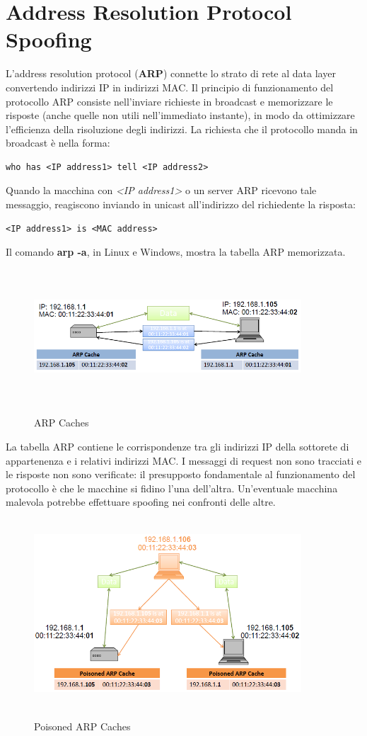 \section{Address Resolution Protocol Spoofing}
L'address resolution protocol (\textbf{ARP}) connette lo strato di rete al data layer convertendo indirizzi IP in indirizzi MAC. Il principio di funzionamento del protocollo ARP consiste nell'inviare richieste in broadcast e memorizzare le risposte (anche quelle non utili nell'immediato instante), in modo da ottimizzare l'efficienza della risoluzione degli indirizzi. La richiesta che il protocollo manda in broadcast è nella forma: 
\begin{lstlisting}
who has <IP address1> tell <IP address2>
\end{lstlisting}
Quando la macchina con \textit{<IP address1>} o un server ARP ricevono tale messaggio, reagiscono inviando in unicast all'indirizzo del richiedente la risposta:
\begin{lstlisting}
<IP address1> is <MAC address>
\end{lstlisting}
Il comando \textbf{arp -a}, in Linux e Windows, mostra la tabella ARP memorizzata. 
\begin{figure}[htbp]
	\centering%
	\subfigure%
	{\includegraphics[height=5cm, width=10cm, keepaspectratio]{Immagini/reti/ARP_Caches.png}}
	\caption{ARP Caches\label{fig:ARP_Caches}} 	
\end{figure}
La tabella ARP contiene le corrispondenze tra gli indirizzi IP della sottorete di appartenenza e i relativi indirizzi MAC. I messaggi di request non sono tracciati e le risposte non sono verificate: il presupposto fondamentale al funzionamento del protocollo è che le macchine si fidino l'una dell'altra. Un'eventuale macchina malevola potrebbe effettuare spoofing nei confronti delle altre.
\begin{figure}[htbp]
	\centering%
	\subfigure%
	{\includegraphics[height=7cm, width=10cm, keepaspectratio]{Immagini/reti/Poisoned_ARP_Caches.png}}
	\caption{Poisoned ARP Caches\label{fig:Poisoned_ARP_Caches}} 	
\end{figure}
